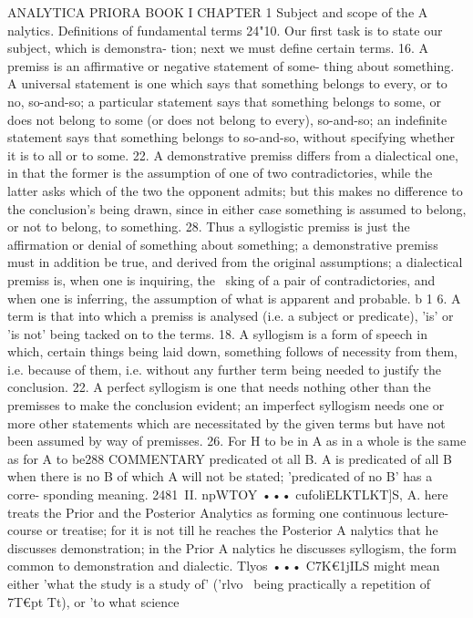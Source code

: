 ANALYTICA PRIORA
BOOK I
CHAPTER 1
Subject and scope of the A nalytics. Definitions of fundamental
terms
24"10. Our first task is to state our subject, which is demonstra-
tion; next we must define certain terms.
16. A premiss is an affirmative or negative statement of some-
thing about something. A universal statement is one which says
that something belongs to every, or to no, so-and-so; a particular
statement says that something belongs to some, or does not
belong to some (or does not belong to every), so-and-so; an
indefinite statement says that something belongs to so-and-so,
without specifying whether it is to all or to some.
22. A demonstrative premiss differs from a dialectical one, in
that the former is the assumption of one of two contradictories,
while the latter asks which of the two the opponent admits; but
this makes no difference to the conclusion's being drawn, since in
either case something is assumed to belong, or not to belong, to
something.
28. Thus a syllogistic premiss is just the affirmation or denial
of something about something; a demonstrative premiss must in
addition be true, and derived from the original assumptions; a
dialectical premiss is, when one is inquiring, the ~sking of a pair
of contradictories, and when one is inferring, the assumption of
what is apparent and probable.
b 1 6. A term is that into which a premiss is analysed (i.e. a
subject or predicate), 'is' or 'is not' being tacked on to the terms.
18. A syllogism is a form of speech in which, certain things
being laid down, something follows of necessity from them, i.e.
because of them, i.e. without any further term being needed to
justify the conclusion.
22. A perfect syllogism is one that needs nothing other than the
premisses to make the conclusion evident; an imperfect syllogism
needs one or more other statements which are necessitated by the
given terms but have not been assumed by way of premisses.
26. For H to be in A as in a whole is the same as for A to be288
COMMENTARY
predicated ot all B. A is predicated of all B when there is no B
of which A will not be stated; 'predicated of no B' has a corre-
sponding meaning.
2481~II. npWTOY ••• cufoliELKTLKT]S, A. here treats the Prior and
the Posterior Analytics as forming one continuous lecture-course
or treatise; for it is not till he reaches the Posterior A nalytics that
he discusses demonstration; in the Prior A nalytics he discusses
syllogism, the form common to demonstration and dialectic.
Tlyos ••• C7K€1jILS might mean either 'what the study is a study of'
('rlvo~ being practically a repetition of 7T€pt Tt), or 'to what science
